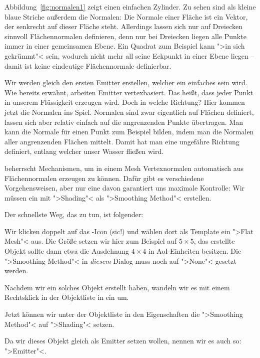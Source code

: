 \documentclass[10pt,DIV=14,a4paper]{scrartcl}
\begin{document}
Abbildung~\ref{fig:normalen1} zeigt einen einfachen Zylinder. Zu sehen
sind als kleine blaue Striche außerdem die Normalen: Die Normale einer
Fläche ist ein Vektor, der senkrecht auf dieser Fläche steht. Allerdings
lassen sich nur auf Dreiecken sinnvoll Flächennormalen definieren, denn
nur bei Dreiecken liegen alle Punkte immer in einer gemeinsamen Ebene.
Ein Quadrat zum Beispiel kann ">in sich gekrümmt"< sein, wodurch nicht
mehr all seine Eckpunkt in einer Ebene liegen -- damit ist keine
eindeutige Flächennormale definierbar.

Wir werden gleich den ersten Emitter erstellen, welcher ein einfaches
\TriMesh sein wird. Wie bereits erwähnt, arbeiten Emitter vertexbasiert.
Das heißt, dass jeder Punkt in unserem \TriMesh Flüssigkeit erzeugen
wird. Doch in welche Richtung? Hier kommen jetzt die Normalen ins Spiel.
Normalen sind zwar eigentlich auf Flächen definiert, lassen sich aber
relativ einfach auf die angrenzenden Punkte übertragen. Man kann die
Normale für einen Punkt zum Beispiel bilden, indem man die Normalen
aller angrenzenden Flächen mittelt. Damit hat man eine ungefähre
Richtung definiert, entlang welcher unser Wasser fließen wird.

\aoi beherrscht Mechanismen, um in einem Mesh Vertexnormalen automatisch
aus Flächennormalen erzeugen zu können. Dafür gibt es verschiedene
Vorgehensweisen, aber nur eine davon garantiert uns maximale Kontrolle:
Wir müssen ein \TriMesh mit ">Shading"< als ">Smoothing Method"<
erstellen.

Der schnellste Weg, das zu tun, ist folgender:
\itA
	\item Wir klicken doppelt auf das \PolyMesh-Icon (sic!) und wählen
	dort als Template ein ">Flat Mesh"< aus. Die Größe setzen wir hier
	zum Beispiel auf $5 \times 5$, das erstellte Objekt sollte dann etwa
	die Ausdehnung $4 \times 4$ in AoI-Einheiten besitzen. Die
	">Smoothing Method"< in \emph{diesem} Dialog muss noch auf ">None"<
	gesetzt werden.

	\item Nachdem wir ein solches Objekt erstellt haben, wandeln wir es
	mit einem Rechtsklick in der Objektliste in ein \TriMesh um.

	\item Jetzt können wir unter der Objektliste in den Eigenschaften
	die ">Smoothing Method"< auf ">Shading"< setzen.

	\item Da wir dieses Objekt gleich als Emitter setzen wollen, nennen
	wir es auch so: ">Emitter"<.
\end{document}

